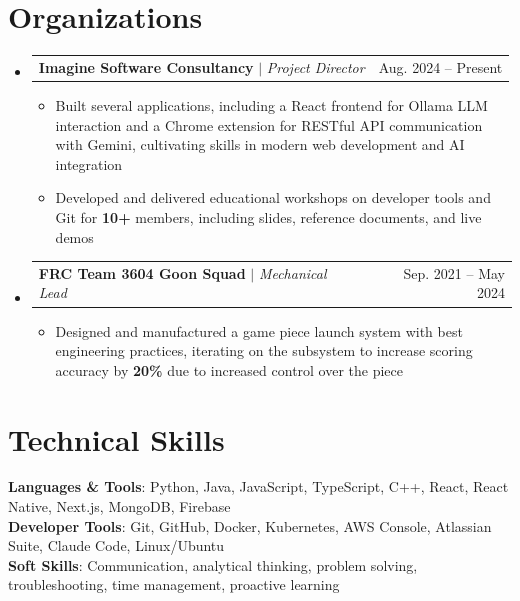 \documentclass[letterpaper,11pt]{article}
\makeatletter
\newcommand{\resumeItem}[1]{
  \item\small{
    {#1 \vspace{-4pt}}
  }
}
\newcommand{\resumeProjectHeading}[2]{
    \item
    \begin{tabular*}{0.97\textwidth}{l@{\extracolsep{\fill}}r}
      \small#1 & #2 \\
    \end{tabular*}\vspace{-7pt}
}
\newcommand{\resumeSubHeadingListStart}{\begin{itemize}[leftmargin=0.15in, label={}]}
\newcommand{\resumeSubHeadingListEnd}{\end{itemize}}
\newcommand{\resumeItemListStart}{\begin{itemize}}
\newcommand{\resumeItemListEnd}{\end{itemize}\vspace{-5pt}}
\makeatother
\begin{document}
\section{Organizations}
  \resumeSubHeadingListStart

    \resumeProjectHeading
      {\textbf{Imagine Software Consultancy} $|$ \emph{Project Director}}{Aug. 2024 -- Present}
      \resumeItemListStart
        \resumeItem{Built several applications, including a React frontend for Ollama LLM interaction and a Chrome extension for RESTful API communication with Gemini, cultivating skills in modern web development and AI integration}
        \resumeItem{Developed and delivered educational workshops on developer tools and Git for \textbf{10+} members, including slides, reference documents, and live demos}
      \resumeItemListEnd

    \resumeProjectHeading
      {\textbf{FRC Team 3604 Goon Squad} $|$ \emph{Mechanical Lead}}{Sep. 2021 -- May 2024}
      \resumeItemListStart
        \resumeItem{Designed and manufactured a game piece launch system with best engineering practices, iterating on the subsystem to increase scoring accuracy by \textbf{20\%} due to increased control over the piece}
      \resumeItemListEnd

 \resumeSubHeadingListEnd
 
%
\section{Technical Skills}
 \begin{itemize}[leftmargin=0.15in, label={}]
    \small{\item{
     \textbf{Languages \& Tools}{: Python, Java, JavaScript, TypeScript, C++, React, React Native, Next.js, MongoDB, Firebase} \\
     \textbf{Developer Tools}{: Git, GitHub, Docker, Kubernetes, AWS Console, Atlassian Suite, Claude Code, Linux/Ubuntu} \\
     \textbf{Soft Skills}{: Communication, analytical thinking, problem solving, troubleshooting, time management, proactive learning} \\
    }}
 \end{itemize}


\end{document}
